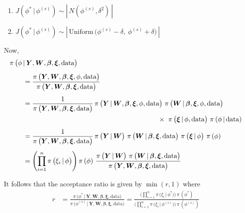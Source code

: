 \documentclass[11pt]{article}
\renewcommand{\vec}{\boldsymbol}
\newcommand{\barS}{\,|\,}
\begin{document}
\begin{enumerate}[label=Step \arabic*., leftmargin=13mm, itemsep=10mm]
\begin{enumerate}[label=(\roman*), itemsep=3mm]
\item $ J\left( \phi^* \barS \phi^{(s)} \right) \sim \left|\, N\left( \phi^{(s)}, \delta^2 \right) \,\right| $
\item $ J\left( \phi^* \barS \phi^{(s)} \right) \sim \left|\, \text{Uniform}\, \big( \phi^{(s)} - \delta,~ \phi^{(s)} + \delta \big) \,\right| $
\end{enumerate} \vspace{6mm}


Now,
\begin{align*} \MoveEqLeft
\pi\, \big( \phi \barS \vec{Y}, \vec{W}, \vec{\beta}, \vec{\xi}, \text{data} \big) \\[1ex]
&= \frac{ \pi\,\big( \vec{Y}, \vec{W}, \vec{\beta}, \vec{\xi}, \phi, \text{data} \big) }{ \pi\,\big( \vec{Y}, \vec{W}, \vec{\beta}, \vec{\xi}, \text{data} \big) } \\[1ex]
&= \frac{ 1 }{ \pi\,\big( \vec{Y}, \vec{W}, \vec{\beta}, \vec{\xi}, \text{data} \big) }\, \pi\,\big( \vec{Y} \barS \vec{W}, \vec{\beta}, \vec{\xi}, \phi, \text{data} \big)~ \pi\,\big( \vec{W} \barS \vec{\beta}, \vec{\xi}, \phi, \text{data} \big)\\
& \hspace{70mm} \times~ \pi\,\big( \vec{\xi} \barS \phi, \text{data} \big)~ \pi\,(\phi \barS \text{data}) \\[1ex]
&= \frac{ 1 }{ \pi\,\big( \vec{Y}, \vec{W}, \vec{\beta}, \vec{\xi}, \text{data} \big) }\, \pi\,\big( \vec{Y} \barS \vec{W} \big)~ \pi\,\big( \vec{W} \barS \vec{\beta}, \vec{\xi}, \text{data} \big)~ \pi\,\big( \vec{\xi} \barS \phi \big)~ \pi\,(\phi) \\[1ex]
&= \left( \prod_{i=1}^n \pi\,\big( \xi_i \barS \phi \big) \right) \pi\,(\phi)~ \frac{ \pi\,\big( \vec{Y} \barS \vec{W} \big)~ \pi\,\big( \vec{W} \barS \vec{\beta}, \vec{\xi}, \text{data} \big) }{ \pi\,\big( \vec{Y}, \vec{W}, \vec{\beta}, \vec{\xi}, \text{data} \big) }
\end{align*}


It follows that the acceptance ratio is given by $\min(r,1)$ where
\begin{align*}
r &= \frac{ \pi\, \big( \phi^* \barS \vec{Y}, \vec{W}, \vec{\beta}, \vec{\xi}, \text{data} \big) }{ \pi\, \big( \phi^{(s)} \barS \vec{Y}, \vec{W}, \vec{\beta}, \vec{\xi}, \text{data} \big) } = \frac{ \bigg( \prod_{i=1}^n \pi\,\big( \xi_i \barS \phi^* \big) \bigg)\, \pi\,(\phi^*) }{ \bigg( \prod_{i=1}^n \pi\,\big( \xi_i \barS \phi^{(s)} \big) \bigg)\, \pi\,(\phi^{(s)}) }
\end{align*}

\end{enumerate}
\end{document}
